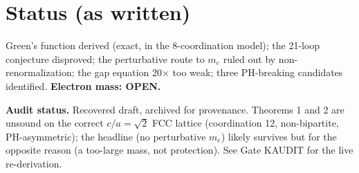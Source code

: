 \documentclass[aps,prl,preprint,superscriptaddress,floatfix]{revtex4-2}
\newcommand{\me}{m_e}
\begin{document}
\section*{Status (as written)}
Green's function derived (exact, in the 8-coordination model); the 21-loop conjecture disproved;
the perturbative route to $\me$ ruled out by non-renormalization; the gap equation 20$\times$ too
weak; three PH-breaking candidates identified. \textbf{Electron mass: OPEN.}

\medskip
\noindent\textbf{Audit status.} Recovered draft, archived for provenance. Theorems 1 and 2 are
unsound on the correct $c/a=\sqrt2$ FCC lattice (coordination 12, non-bipartite, PH-asymmetric); the
headline (no perturbative $\me$) likely survives but for the opposite reason (a too-large mass, not
protection). See Gate KAUDIT for the live re-derivation.
\end{document}
